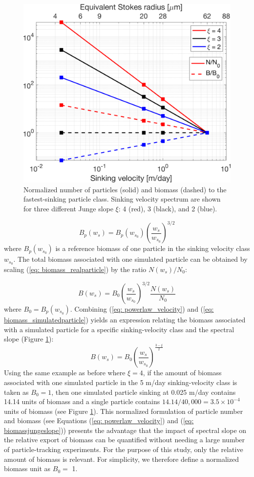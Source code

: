 \documentclass[draft,linenumbers]{agujournal2018}
\begin{document}
\begin{figure}[ht]
	\centering
	\includegraphics[width = .6\linewidth]{figures/Fig4_particle_PDF}
	\caption{Normalized number of particles (solid) and biomass (dashed) to the fastest-sinking particle class. Sinking velocity spectrum are shown for three different Junge slope $\xi$: 4 (red), 3 (black), and 2 (blue).}
	\label{fig: sinking_velocity_spectrum}
\end{figure}

\begin{equation}
	B_p(w_s) = B_p(w_{s_0})\left(\frac{w_s}{w_{s_0}}\right)^{3/2}
	\label{eq: biomass_realparticle}
\end{equation}
where $B_p(w_{s_0})$ is a reference biomass of one particle in the sinking velocity class $w_{s_0}$. The total biomass associated with one simulated particle can be obtained by scaling (\ref{eq: biomass_realparticle}) by the ratio $N(w_s)/N_0$:

\begin{equation}
	B(w_s) =  B_0\left(\frac{w_s}{w_{s_0}}\right)^{3/2}\frac{N(w_s)}{N_0}
	\label{eq: biomass_simulatedparticle}
\end{equation}
where $B_0 = B_p(w_{s_0})$. Combining (\ref{eq: powerlaw_velocity}) and (\ref{eq: biomass_simulatedparticle}) yields an expression relating the biomass associated with a simulated particle for a specific sinking-velocity class and the spectral slope (Figure \ref{fig: sinking_velocity_spectrum}):
\begin{equation}
	B(w_s) = B_0\left(\frac{w_s}{w_{s_0}}\right)^{\frac{3-\xi}{2}}
	\label{eq: biomassjungeslope}
\end{equation}
Using the same example as before where $\xi = 4$, if the amount of biomass associated with one simulated particle in the 5 m/day sinking-velocity class is taken as $B_0 = 1$, then one simulated particle sinking at 0.025 m/day contains 14.14 units of biomass and a single particle contains $14.14/40,000 =3.5\times10^{-4}$ units of biomass (see Figure \ref{fig: sinking_velocity_spectrum}). This normalized formulation of particle number and biomass (see Equations (\ref{eq: powerlaw_velocity}) and (\ref{eq: biomassjungeslope})) presents the advantage that the impact of spectral slope on the relative export of biomass can be quantified without needing a large number of particle-tracking experiments. For the purpose of this study, only the relative amount of biomass is relevant. For simplicity, we therefore define a normalized biomass unit as $B_0=$ 1.
\end{document}
